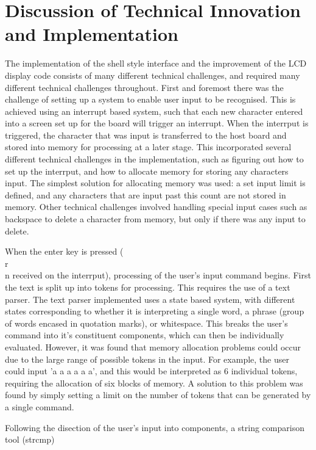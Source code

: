 \section{Discussion of Technical Innovation and Implementation}

The implementation of the shell style interface and the improvement of the LCD 
display code consists of many different technical challenges, and required many 
different technical challenges throughout. First and foremost there was the 
challenge of setting up a system to enable user input to be recognised. This is 
achieved using an interrupt based system, such that each new character entered into 
a screen set up for the board will trigger an interrupt. When the interrput is 
triggered, the character that was input is transferred to the host board and stored into 
memory for processing at a later stage. This incorporated several different technical 
challenges in the implementation, such as figuring out how to set up the interrput, and 
how to allocate memory for storing any characters input. The simplest solution for 
allocating memory was used: a set input limit is defined, and any characters that are 
input past this count are not stored in memory. Other technical challenges involved handling 
special input cases such as backspace to delete a character from memory, but only if there 
was any input to delete. 
\par\bigskip\noindent
When the enter key is pressed (\\r\\n received on the interrput), processing of the user's 
input command begins. 
First the text is split up into tokens for processing. This 
requires the use of a text parser. The text parser implemented uses a state based system,
with different states corresponding to whether it is interpreting a single word, a phrase 
(group of words encased in quotation marks), or whitespace. This breaks the user's 
command into it's constituent components, which can then be individually evaluated. 
However, it was found that memory allocation problems could occur due to the large range of 
possible tokens in the input. For example, the user could input 'a a a a a a', and this 
would be interpreted as 6 individual tokens, requiring the allocation of six blocks of 
memory. A solution to this problem was found by simply setting a limit on the number 
of tokens that can be generated by a single command. 
\par\bigskip\noindent
Following the disection of the user's input into components, a string comparison tool (strcmp)
